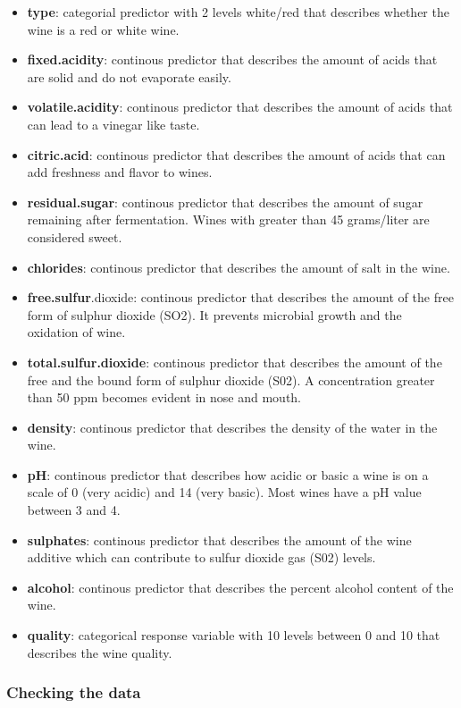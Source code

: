 \documentclass[
]{article}
\providecommand{\tightlist}{%
  \setlength{\itemsep}{0pt}\setlength{\parskip}{0pt}}
\begin{document}
\begin{itemize}
\tightlist
\item
  \textbf{type}: categorial predictor with 2 levels white/red that
  describes whether the wine is a red or white wine.
\item
  \textbf{fixed.acidity}: continous predictor that describes the amount
  of acids that are solid and do not evaporate easily.
\item
  \textbf{volatile.acidity}: continous predictor that describes the
  amount of acids that can lead to a vinegar like taste.
\item
  \textbf{citric.acid}: continous predictor that describes the amount of
  acids that can add freshness and flavor to wines.
\item
  \textbf{residual.sugar}: continous predictor that describes the amount
  of sugar remaining after fermentation. Wines with greater than 45
  grams/liter are considered sweet.
\item
  \textbf{chlorides}: continous predictor that describes the amount of
  salt in the wine.
\item
  \textbf{free.sulfur}.dioxide: continous predictor that describes the
  amount of the free form of sulphur dioxide (SO2). It prevents
  microbial growth and the oxidation of wine.
\item
  \textbf{total.sulfur.dioxide}: continous predictor that describes the
  amount of the free and the bound form of sulphur dioxide (S02). A
  concentration greater than 50 ppm becomes evident in nose and mouth.
\item
  \textbf{density}: continous predictor that describes the density of
  the water in the wine.
\item
  \textbf{pH}: continous predictor that describes how acidic or basic a
  wine is on a scale of 0 (very acidic) and 14 (very basic). Most wines
  have a pH value between 3 and 4.
\item
  \textbf{sulphates}: continous predictor that describes the amount of
  the wine additive which can contribute to sulfur dioxide gas (S02)
  levels.
\item
  \textbf{alcohol}: continous predictor that describes the percent
  alcohol content of the wine.
\item
  \textbf{quality}: categorical response variable with 10 levels between
  0 and 10 that describes the wine quality.
\end{itemize}

\hypertarget{checking-the-data}{%
\subsubsection{Checking the data}\label{checking-the-data}}
\end{document}
